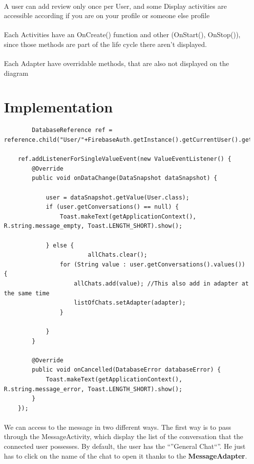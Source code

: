 \documentclass[paper=a4, fontsize=12pt,DIV=14]{scrartcl}    %
\begin{document}
				\paragraph{}A user can add review only once per User, and some Display activities are accessible according if you are on your profile or someone else profile
				\paragraph{}Each Activities have an OnCreate() function and other (OnStart(), OnStop()), since those methods are part of the life cycle there aren’t displayed.
				\paragraph{}Each Adapter have overridable methods, that are also not displayed on the diagram


    \newpage
        \section{Implementation}
\begin{lstlisting}
        DatabaseReference ref = reference.child("User/"+FirebaseAuth.getInstance().getCurrentUser().getUid());

    ref.addListenerForSingleValueEvent(new ValueEventListener() {
        @Override
        public void onDataChange(DataSnapshot dataSnapshot) {

            user = dataSnapshot.getValue(User.class);
            if (user.getConversations() == null) {
                Toast.makeText(getApplicationContext(), R.string.message_empty, Toast.LENGTH_SHORT).show();

            } else {
                        allChats.clear();
                for (String value : user.getConversations().values()) {
                    allChats.add(value); //This also add in adapter at the same time
                    listOfChats.setAdapter(adapter);
                }

            }
        }

        @Override
        public void onCancelled(DatabaseError databaseError) {
            Toast.makeText(getApplicationContext(), R.string.message_error, Toast.LENGTH_SHORT).show();
        }
    });
	\end{lstlisting}
	\paragraph{}We can access to the message in two different ways. The first way is to pass through the MessageActivity, which display the list of the conversation that the connected user possesses. By default, the user has the ``''General Chat``''. He just has to click on the name of the chat to open it thanks to the \textbf{MessageAdapter}.
\end{document}
